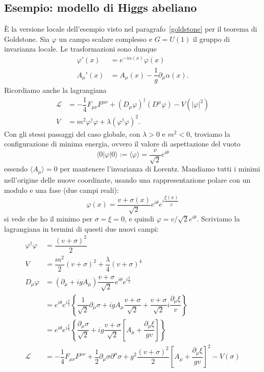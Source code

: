 \documentclass[italian,a4paper]{article}
\theoremstyle{definition}
\newcommand{\lagr}{\ensuremath{\mathscr{L}}}
\newcommand{\dimu}{\ensuremath{\partial_{\mu}}}
\newcommand{\Dimu}{\ensuremath{D_{\mu}}}
\begin{document}
\subsection*{Esempio: modello di Higgs abeliano}
\`E la versione locale dell'esempio visto nel
paragrafo~\ref{goldstone} per il teorema di Goldstone. Sia $\varphi$ un
campo scalare complesso e $G = U(1)$ il gruppo di invarianza locale. Le
trasformazioni sono dunque
\begin{align*}
    \varphi'(x) &= e^{-i \alpha(x)}\varphi(x)\\
    A_\mu'(x) &= A_\mu(x) - \dfrac{1}{g}\partial_\mu \alpha(x).
\end{align*}
Ricordiamo anche la lagrangiana
\begin{align*}
    \lagr &= -\dfrac{1}{4}F_{\mu\nu}F^{\mu\nu} + (D_\mu\varphi)^\dagger(D^\mu
    \varphi) - V(|\varphi|^2)\\
    V &= m^2 \varphi^\dagger \varphi + \lambda (\varphi^\dagger \varphi)^2.
\end{align*}
Con gli stessi passaggi del caso globale, con $\lambda > 0$ e $m^2 <0$,
troviamo la configurazione di minima energia, ovvero il valore di
aspettazione del vuoto
\begin{equation*}
    \langle 0 \vert \varphi \vert 0 \rangle \mathop:= \langle \varphi
    \rangle = \dfrac{v}{\sqrt{2}}e^{i\theta}
\end{equation*}
essendo $\langle A_\mu \rangle = 0$ per mantenere l'invarianza di Lorentz.
Mandiamo tutti i minimi nell'origine delle nuove coordinate, usando una
rappresentazione polare con un modulo e una fase (due campi reali):
\begin{equation*}
    \varphi(x) = \dfrac{v +
    \sigma(x)}{\sqrt{2}}e^{i\theta}e^{i\dfrac{\xi(x)}{v}}
\end{equation*}
si vede che ho il minimo per $\sigma = \xi = 0$, e quindi $\varphi =
v/\sqrt{2}e^{i\theta}$. Scriviamo la lagrangiana in termini di questi due
nuovi campi:
\begin{align*}
    \varphi^\dagger \varphi &= \dfrac{(v + \sigma)^2}{2}\\
    V &= \dfrac{m^2}{2}(v + \sigma)^2 + \dfrac{\lambda}{4}(v + \sigma)^4\\
    \Dimu \varphi &= (\dimu + i g A_{\mu}) \dfrac{v +
    \sigma}{\sqrt{2}}e^{i\theta}e^{i\frac{\xi}{v}}\\
    &= e^{i\theta}e^{i\frac{\xi}{v}}
    \left\{
    \dfrac{1}{\sqrt{2}}\dimu \sigma 
    + i g A_\mu \dfrac{v + \sigma}{\sqrt{2}}
    + \dfrac{v + \sigma}{\sqrt{2}} i\dfrac{\dimu \xi}{v}\right\}\\
    &= e^{i\theta}e^{i\frac{\xi}{v}}
    \left\{
    \dfrac{\dimu \sigma}{\sqrt{2}}
    + i g \dfrac{v + \sigma}{\sqrt{2}} \left[ A_\mu + \dfrac{\dimu \xi}{gv}\right]
    \right\}\\
    \lagr &= -\dfrac{1}{4}F_{\mu\nu}F^{\mu\nu}
    + \dfrac{1}{2}\partial_\mu \sigma \partial^\mu \sigma
    + g^2 \dfrac{(v + \sigma)^2}{2}\left[ A_{\mu} + \dfrac{\dimu
    \xi}{gv}\right]^2 - V(\sigma)
\end{align*}
\end{document}

